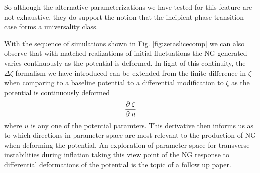 So although the alternative parameterizations we have tested for this feature are not exhaustive, they do support the notion that the incipient phase transition case forms a universality class.

\Fzetaslicecomp

\Fpotparamcomp




\Fzetapkcomp

\Fzetapdfcomp


With the sequence of simulations shown in Fig. \ref{fig:zetaslicecomp} we can also observe that with matched realizations of initial fluctuations the NG generated varies continuously as the potential is deformed. In light of this continuity, the $\Delta\zeta$ formalism we have introduced can be extended from the finite difference in $\zeta$ when comparing to a baseline potential to a differential modification to $\zeta$ as the potential is continuously deformed
\begin{equation}
  \frac{\partial\, \zeta}{\partial\, u}
\end{equation}
where $u$ is any one of the potential paramters.
This derivative then informs us as to which directions in parameter space are most relevant to the production of NG when deforming the potential. An exploration of parameter space for transverse instabilities during inflation taking this view point of the NG response to differential deformations of the potential is the topic of a follow up paper. 


